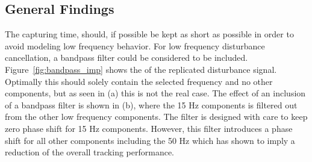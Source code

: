 \subsection{General Findings}\label{subsec:longterm}
The capturing time, should, if possible be kept as short as possible in order to avoid modeling low frequency behavior. For low frequency disturbance cancellation, a bandpass filter could be considered to be included. Figure~\ref{fig:bandpass_imp} shows the \abbrFFT of the replicated disturbance signal. Optimally this should solely contain the selected frequency and no other components, but as seen in (a) this is not the real case. The effect of an inclusion of a bandpass filter is shown in (b), where the 15 Hz components is filtered out from the other low frequency components. The filter is designed with care to keep zero phase shift for 15 Hz components. However, this filter introduces a phase shift for all other components including the 50 Hz which has shown to imply a reduction of the overall tracking performance.

